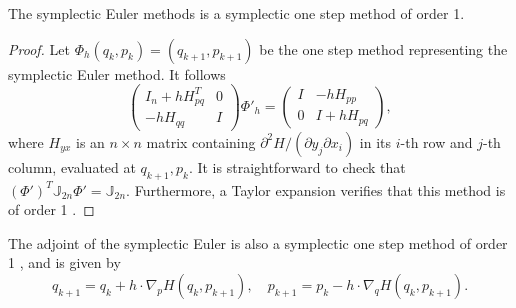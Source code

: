 \begin{theorem} \cite{hairer2006geometric}
The symplectic Euler methods is a symplectic one step method of order 1.
\end{theorem}
\begin{proof}
Let $\Phi_h(q_k,p_k) = (q_{k+1},p_{k+1})$ be the one step method representing the symplectic Euler method. It follows
\begin{equation*}
	\begin{pmatrix}
		I_n + h H_{pq}^T & 0 \\
		-hH_{qq} & I	
	\end{pmatrix}
	\Phi'_h = 
	\begin{pmatrix}
		I & -h H_{pp} \\
		0 & I+ h H_{pq}
	\end{pmatrix},
\end{equation*}
where $H_{yx}$ is an $n\times n$ matrix containing ${\partial^2 H }/{(\partial y_j \partial x_i)}$ in its $i$-th row and $j$-th column, evaluated at $q_{k+1},p_k$. It is straightforward to check that $(\Phi')^T \mathbb J_{2n} \Phi' = \mathbb J_{2n}$. Furthermore, a Taylor expansion verifies that this method is of order 1 \cite{hairer2006geometric}.
\end{proof}

The adjoint of the symplectic Euler is also a symplectic one step method of order 1 \cite{hairer2006geometric}, and is given by
\begin{equation}
	q_{k+1} = q_k + h \cdot \nabla_p H(q_k,p_{k+1}),\quad p_{k+1} = p_k - h \cdot \nabla_q H(q_{k},p_{k+1}).
\end{equation}

